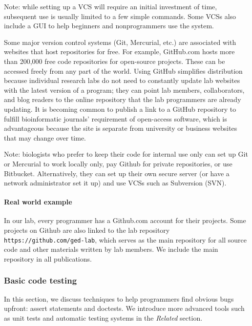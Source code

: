 \documentclass[ChapterTOCs,krantz2]{krantz} %
\begin{document}
Note: while setting up a VCS will require an initial investment of time, 
subsequent use is usually limited to a few simple commands.  Some VCSs
also include a GUI to help beginners and nonprogrammers use the system.

Some major version control systems (Git, Mercurial, etc.) are associated with websites 
that host repositories for free.  For example, GitHub.com hosts more than 200,000 free code
repositories for open-source projects. These can be accessed
freely from any part of the world.  Using GitHub
simplifies distribution because individual research labs do not need to
constantly update lab websites with the latest version of a program;
they can point lab members, collaborators, and blog readers to the online
repository that the lab programmers are already updating.  It is becoming 
common to publish a link to a GitHub repository to
fulfill bioinformatic journals' requirement of open-access software, 
which is advantageous because the site is separate from
university or business websites that may change over time.  

Note: biologists who prefer to keep their
code for internal use only can set up Git or Mercurial to work 
locally only, pay Github for private repositories, or use Bitbucket.  
Alternatively, they can set up their own secure
server (or have a network administrator set it up) and use
VCSs such as Subversion (SVN).

\paragraph{Real world example}

In our lab, every programmer has a Github.com account for their projects.
Some
projects on Github are also linked to the lab repository
\texttt{https://github.com/ged-lab}, which serves as the main repository for
all source code and other materials written by lab members. 
We include the main repository in all
publications. 

\subsubsection{Basic code testing}

In this section, we discuss techniques to help
programmers find obvious bugs upfront: 
assert statements and doctests. We introduce more advanced
tools such as unit tests and automatic testing systems in the \emph{Related}
section.
\end{document}
